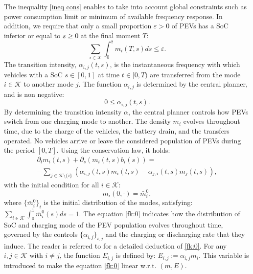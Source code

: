 \documentclass[conference]{IEEEtran}
\def\K{\mathcal{K}}
\begin{document}
The inequality \eqref{ineq cons} enables to take into account global constraints such as power consumption limit or minimum of available frequency response. 
In addition, we require that only a small proportion $\varepsilon>0$ of PEVs has a SoC inferior or equal to $\underline{s}\geq 0$ at the final moment $T$: 
\begin{equation}
\label{minsoc}
\sum_{i\in\K} \int_0^{\underline{s}} m_i(T,s) ds \leq \varepsilon. 
\end{equation}
 The transition intensity, $\alpha_{i,j}(t,s)$, is the instantaneous frequency with which vehicles with a SoC $s\in[0,1]$ at time $t\in[0,T)$ are transferred from the mode $i\in\K $ to another mode $j$. The function $\alpha_{i,j}$  is determined by the central planner, and is non negative:
 \begin{equation}
 \label{consalpha} 0\leq \alpha_{i,j}(t,s).
 \end{equation}
 By determining the transition intensity $\alpha$, the central planner controls how PEVs switch from one charging mode to another.
 The density $m_i$ evolves throughout time, due to the charge of the vehicles, the battery drain, and the transfers operated. No vehicles arrive or leave the considered population of PEVs during the period $[0,T]$. Using the conservation law, it holds:
\begin{equation}
\label{fk:0}
\begin{array}{l}
\partial_t m_i(t,s)+\partial_s(m_i(t,s)b_i(s))=  \\
-\sum_{j\in\K\setminus\{i\}}(\alpha_{i,j}(t,s)m_i(t,s)-\alpha_{j,i}(t,s)m_{j}(t,s)),
\end{array}
\end{equation}
with the initial condition for all $i\in\K$:
\begin{equation}
\label{inital_cond}
m_i(0,\cdot) = \bar{m}^0_i,
\end{equation}
where $\{\bar{m}^0_i\}_i$ is the initial distribution of the modes, satisfying: $\sum_{i\in\K} \int_0^1\bar{m}^0_i(s)ds =1$. 
The equation \eqref{fk:0} indicates how the distribution of SoC and charging mode of the PEV population evolves throughout time, governed by the controls $\{\alpha_{i,j}\}_{i,j}$ and the charging or discharging rate that they induce.
The reader is referred to  \cite{le2016pde} for a detailed deduction of \eqref{fk:0}.
For any $i,j\in\K $ with $i\neq j$, the function $E_{i,j}$ is defined by: $E_{i,j}:=\alpha_{i,j}m_i$.
This variable is introduced to make the equation \eqref{fk:0} linear w.r.t. $(m,E)$.
\end{document}
